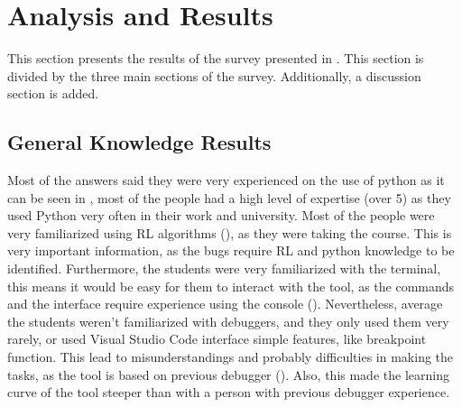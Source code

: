 
\chapter{Analysis and Results}
\label{cha:results}
This section presents the results of the survey presented in . This section 
is divided by the three main sections of the survey. Additionally, a discussion section is added. 

\section{General Knowledge Results}
\label{sec:general-knowledge}
Most of the answers said they were very experienced on the use of python as it
can be seen in , most of the people had a high level of expertise (over 5)
as they used Python very often in their work and university. Most of 
the people were very familiarized using \ac{RL} algorithms (), as they were 
taking the course. This is very important information, as the bugs require \ac{RL} and python 
knowledge to be identified. Furthermore, the students were very familiarized with 
the terminal, this means it would be easy for them to interact with the tool, as the commands 
and the interface require experience using the console (). Nevertheless, 
average the 
students weren't familiarized with debuggers, and they only used them very rarely, or used 
Visual Studio Code interface simple features, like breakpoint function. This lead to 
misunderstandings and probably difficulties in making the tasks, as the tool is based on
previous debugger (). Also, this made the learning curve of the tool 
steeper than with a person with previous debugger experience.

